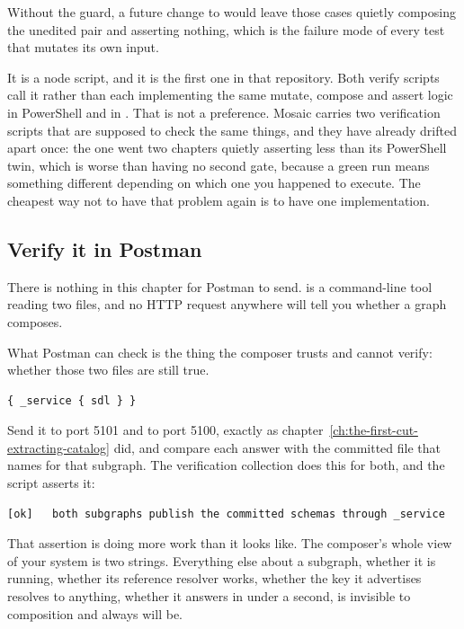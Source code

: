 Without the guard, a future change to  would leave those cases
quietly composing the unedited pair and asserting nothing, which is the failure
mode of every test that mutates its own input.

%
It is a node script, and it is the first one in that repository. Both verify
scripts call it rather than each implementing the same mutate, compose and
assert logic in PowerShell and in . That is not a preference. Mosaic
carries two verification scripts that are supposed to check the same things, and
they have already drifted apart once: the  one went two chapters
quietly asserting less than its PowerShell twin, which is worse than having no
second gate, because a green run means something different depending on which
one you happened to execute. The cheapest way not to have that problem again is
to have one implementation.

\subsection*{Verify it in Postman}

%
There is nothing in this chapter for Postman to send. 
is a command-line tool reading two files, and no HTTP request anywhere will tell
you whether a graph composes.

What Postman can check is the thing the composer trusts and cannot verify:
whether those two files are still true.

\begin{verbatim}
{ _service { sdl } }
\end{verbatim}

Send it to port 5101 and to port 5100, exactly as
chapter~\ref{ch:the-first-cut-extracting-catalog} did, and compare each answer
with the committed file that  names for that
subgraph. The verification collection does this for both, and the script asserts
it:

\begin{verbatim}
[ok]   both subgraphs publish the committed schemas through _service
\end{verbatim}

%
That assertion is doing more work than it looks like. The composer's whole view
of your system is two strings. Everything else about a subgraph, whether it is
running, whether its reference resolver works, whether the key it advertises
resolves to anything, whether it answers in under a second, is invisible to
composition and always will be.

